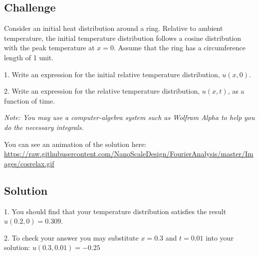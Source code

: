 \subsection*{Challenge}
Consider an initial heat distribution around a ring. Relative to ambient temperature, the initial temperature distribution follows a cosine distribution with the peak temperature at $x=0$. Assume that the ring has a circumference length of 1 unit.

1. Write an expression for the initial relative temperature distribution, $u(x,0)$.

2. Write an expression for the relative temperature distribution, $u(x,t)$, as a function of time.

\emph{Note: You may use a computer-algebra system such as Wolfram Alpha to help you do the necessary integrals.}

You can see an animation of the solution here:\\
\url{https://raw.githubusercontent.com/NanoScaleDesign/FourierAnalysis/master/Images/cosrelax.gif}

\subsection*{Solution}
1. You should find that your temperature distribution satisfies the result $u(0.2,0) = 0.309$.

2. To check your answer you may substitute $x=0.3$ and $t=0.01$ into your solution: $u(0.3,0.01) = -0.25$

